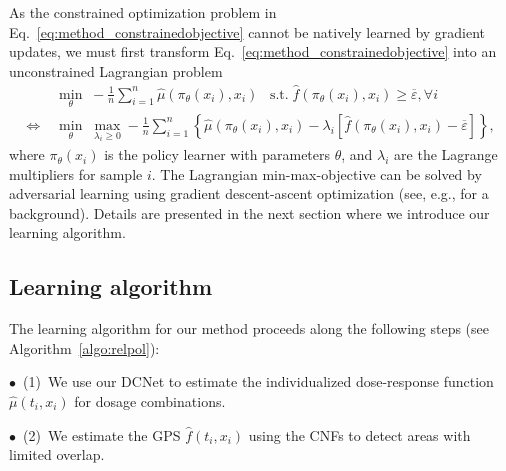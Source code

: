 \documentclass{article}
\theoremstyle{definition}
\theoremstyle{plain}
\begin{document}
As the constrained optimization problem in Eq.~\eqref{eq:method_constrainedobjective} cannot be natively learned by gradient updates, we must first transform Eq.~\eqref{eq:method_constrainedobjective} into an unconstrained Lagrangian problem
\begin{equation}\label{eq:lagrangian_optimization}
    \begin{aligned}
        &  \underset{\theta}{\min} \; - \frac{1}{n}\sum_{i=1}^{n}\hat{\mu} \left( \pi_{\theta}(x_i), x_i \right)
         \; \; \; \text{s.t.} \;  \hat{f} \left( \pi_{\theta}(x_i), x_i \right) \geq \overline{\varepsilon}  , \forall i \\
        \iff \; &  \underset{\theta}{\min} \; \underset{\lambda_i \geq 0}{\max}  - \frac{1}{n}\sum_{i=1}^{n} \left\{ \hat{\mu} \left( \pi_{\theta}(x_i), x_i \right) - \lambda_i \left[ \hat{f} \left( \pi_{\theta}(x_i), x_i \right) - \overline{\varepsilon} \right] \right\},
    \end{aligned}
\end{equation}
where $\pi_{\theta}(x_i)$ is the policy learner with parameters $\theta$, and $\lambda_i $ are the Lagrange multipliers for sample $i$. The Lagrangian min-max-objective can be solved by adversarial learning using gradient descent-ascent optimization (see, e.g., \cite{Lin.2020} for a background). Details are presented in the next section where we introduce our learning algorithm. 

\subsection{Learning algorithm} 
\label{sec:learning_algorithm}

The learning algorithm for our method proceeds along the following steps (see Algorithm~\ref{algo:relpol}):  

$\bullet$~(1)~We use our DCNet to estimate the individualized dose-response function $\hat{\mu}(t_i, x_i)$ for dosage combinations. 

$\bullet$~(2)~We estimate the GPS $\hat{f}(t_i, x_i)$ using the CNFs to detect areas with limited overlap.
\end{document}
